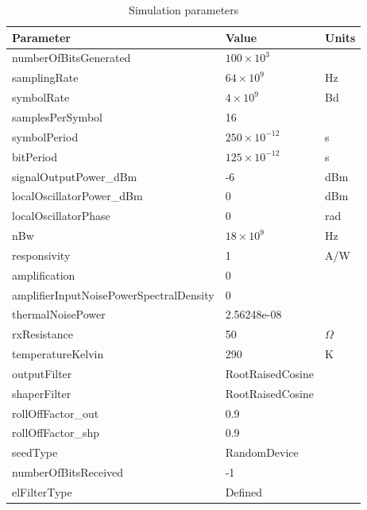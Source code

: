 	\begin{longtable}[h]{|l|l|l|}
	\caption{Simulation parameters\label{tab:simParams_thermal}}\\\hline
	\textbf{Parameter}            & \textbf{Value}       &\textbf{Units}\\\hline
	numberOfBitsGenerated         & $100 \times 10^3$    & \\\hline
	samplingRate                  & $64 \times 10^9$     & Hz \\\hline
	symbolRate                    & $4 \times 10^9$      & Bd \\\hline
	samplesPerSymbol              & 16                   & \\\hline
	symbolPeriod                  & $250\times 10^{-12}$ & s\\\hline
	bitPeriod                     & $125\times 10^{-12}$ & s\\\hline
	signalOutputPower\_dBm        & -6                   & dBm\\\hline
	localOscillatorPower\_dBm     & 0                    & dBm\\\hline
	localOscillatorPhase          & 0                    & rad\\\hline
	nBw                           & $18\times10^9$       & Hz\\\hline
	responsivity                  & 1                 & A/W\\\hline
	amplification                 & 0                    & \\\hline
	amplifierInputNoisePowerSpectralDensity & 0 & \\\hline
	thermalNoisePower             & 2.56248e-08          & \\\hline
	rxResistance                  & 50 & $\Omega$\\\hline
	temperatureKelvin             & 290 & K\\\hline
	outputFilter                  & RootRaisedCosine     & \\\hline
	shaperFilter                  & RootRaisedCosine     & \\\hline
	rollOffFactor\_out            & 0.9                  & \\\hline
	rollOffFactor\_shp            & 0.9                  & \\\hline
	seedType                      & RandomDevice         & \\\hline
	numberOfBitsReceived          & -1                   & \\\hline
	elFilterType                  & Defined              & \\\hline

\end{longtable}
